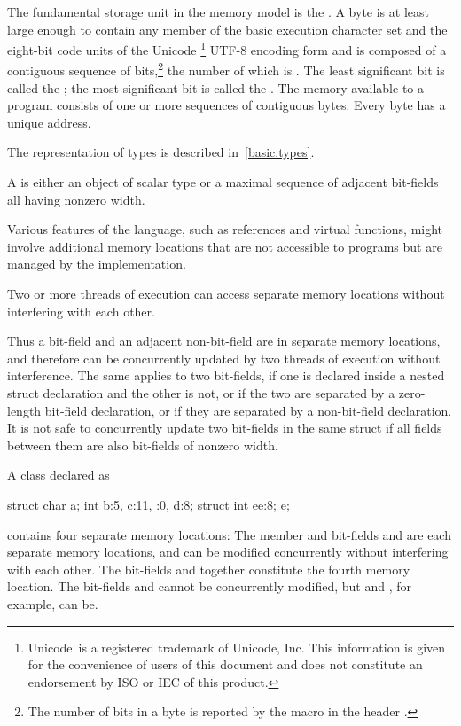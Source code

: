 \pnum
{}%
The fundamental storage unit in the \Cpp{} memory model is the
.
A byte is at least large enough to contain any member of the basic
%
execution character set
and the eight-bit code units of the Unicode%
  \footnote{Unicode\textregistered\ is a registered trademark of Unicode, Inc.
  This information is given for the convenience of users of this document and
  does not constitute an endorsement by ISO or IEC of this product.}
UTF-8 encoding form
and is composed of a contiguous sequence of
bits,\footnote{The number of bits in a byte is reported by the macro
 in the header .}
the number of which is . The least
significant bit is called the ; the most
significant bit is called the . The memory
available to a \Cpp{} program consists of one or more sequences of
contiguous bytes. Every byte has a unique address.

\pnum
\begin{note}
The representation of types is described
in~\ref{basic.types}.
\end{note}

\pnum
A  is either an object of scalar type or a maximal
sequence of adjacent bit-fields all having nonzero width.
\begin{note}
Various
features of the language, such as references and virtual functions, might
involve additional memory locations that are not accessible to programs but are
managed by the implementation.
\end{note}
Two or more threads of
execution can access separate memory
locations without interfering with each other.

\pnum
\begin{note}
Thus a bit-field and an adjacent non-bit-field are in separate memory
locations, and therefore can be concurrently updated by two threads of execution
without interference. The same applies to two bit-fields, if one is declared
inside a nested struct declaration and the other is not, or if the two are
separated by a zero-length bit-field declaration, or if they are separated by a
non-bit-field declaration. It is not safe to concurrently update two bit-fields
in the same struct if all fields between them are also bit-fields of nonzero
width.
\end{note}

\pnum
\begin{example}
A class declared as
\begin{codeblock}
struct {
  char a;
  int b:5,
  c:11,
  :0,
  d:8;
  struct {int ee:8;} e;
}
\end{codeblock}
contains four separate memory locations: The member  and bit-fields
 and  are each separate memory locations, and can be
modified concurrently without interfering with each other. The bit-fields
 and  together constitute the fourth memory location. The
bit-fields  and  cannot be concurrently modified, but
 and , for example, can be.
\end{example}

